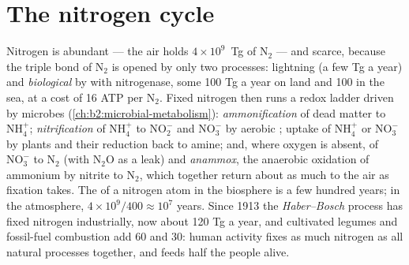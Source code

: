 \section{The nitrogen cycle}

\begin{proposition}\label{prop:b2:biogeochemical-cycles:nitrogen}
Nitrogen is abundant --- the air holds $4\times 10^{9}$~Tg of
$\mathrm{N_2}$ --- and scarce, because the triple bond of $\mathrm{N_2}$ is opened
by only two processes: lightning (a few Tg a year) and
\emph{biological } by  with
nitrogenase, some 100 Tg a year on land and 100 in the sea, at a
cost of 16 ATP per $\mathrm{N_2}$. Fixed nitrogen then runs a redox
ladder driven by microbes (\cref{ch:b2:microbial-metabolism}):
\emph{ammonification} of dead matter to $\mathrm{NH_4^{+}}$;
\emph{nitrification} of $\mathrm{NH_4^{+}}$ to $\mathrm{NO_2^{-}}$ and $\mathrm{NO_3^{-}}$ by
aerobic ; uptake of $\mathrm{NH_4^{+}}$ or $\mathrm{NO_3^{-}}$ by plants
and their reduction back to amine; and, where oxygen is absent,
\emph{} of $\mathrm{NO_3^{-}}$ to $\mathrm{N_2}$ (with $\mathrm{N_2O}$ as a
leak) and \emph{anammox}, the anaerobic oxidation of ammonium by
nitrite to $\mathrm{N_2}$, which together return about as much to the air
as fixation takes. The  of a nitrogen atom in the
biosphere is a few hundred years; in the atmosphere, $4\times
10^{9}/400 \approx 10^{7}$ years. Since 1913 the \emph{Haber--Bosch}
process has fixed nitrogen industrially, now about 120 Tg a year,
and cultivated legumes and fossil-fuel combustion add 60 and 30:
human activity fixes as much nitrogen as all natural processes
together, and feeds half the people alive.
\end{proposition}

